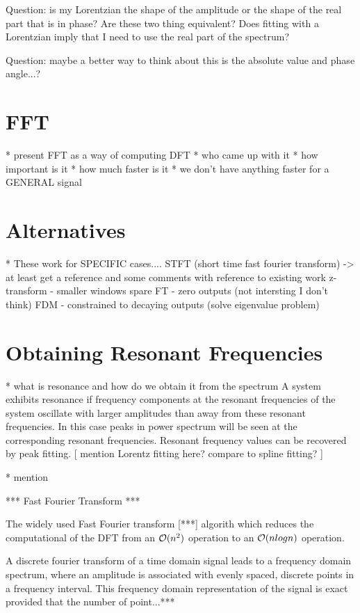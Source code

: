 Question: is my Lorentzian the shape of the amplitude or the shape of the real
part that is in phase? Are these two thing equivalent? Does fitting with a
Lorentzian imply that I need to use the real part of the spectrum?

Question: maybe a better way to think about this is the absolute value and phase
angle...?

\section{FFT} * present FFT as a way of computing DFT * who came up with it *
how important is it * how much faster is it * we don't have anything faster for
a GENERAL signal

\section{Alternatives} * These work for SPECIFIC cases.... STFT (short time fast
fourier transform) -> at least get a reference and some comments with reference
to existing work 
z-transform - smaller windows spare FT - zero outputs (not intersting I don't
think) FDM - constrained to decaying outputs (solve eigenvalue problem)


\section{Obtaining Resonant Frequencies} * what is resonance and how do we
obtain it from the spectrum A system exhibits resonance if frequency components
at the resonant frequencies of the system oscillate with larger amplitudes than
away from these resonant frequencies. In this case peaks in power spectrum will
be seen at the corresponding resonant frequencies. Resonant frequency values can
be recovered by peak fitting. [ mention Lorentz fitting here? compare to spline
fitting? ]

* mention

*** Fast Fourier Transform ***

The widely used Fast Fourier transform [***] algorith which reduces the
computational of the DFT from an $\mathcal{O}(n^2)$ operation to an $\mathcal{O}(n log n)$
operation.

A discrete fourier transform of a time domain signal leads to a frequency domain
spectrum, where an amplitude is associated with evenly spaced, discrete points
in a frequency interval. This frequency domain representation of the signal is
exact provided that the number of point...***

